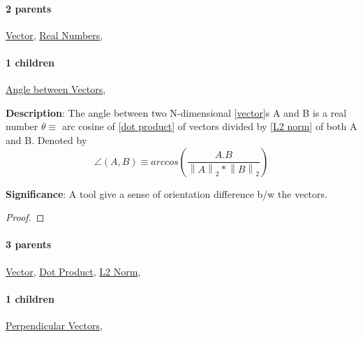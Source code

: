 \documentclass[../main.tex]{subfiles}
\newcommand{\norm}[1]{\left\lVert#1\right\rVert}
\begin{document}
\paragraph{2 parents} \hyperref[statement:Vector]{Vector}, \hyperref[statement:Real Numbers]{Real Numbers}, 
\paragraph{1 children} \hyperref[statement:Angle between Vectors]{Angle between Vectors}, 



\begin{statement}
\label{statement:Angle between Vectors}\hspace*{0pt}\par
\end{statement}
\textbf{Description}:
The angle between two N-dimensional [\hyperref[statement:Vector]{vector}]s A and B is a real number $ \theta \equiv $ arc cosine of [\hyperref[statement:Dot Product]{dot product}] of vectors divided by [\hyperref[statement:L2 Norm]{L2 norm}] of both A and B. Denoted by
\[
  \angle(A,B) \equiv arccos(\frac{A.B}{\norm{A}_2 * \norm{B}_2})
\]
\par
{\color{magenta} \textbf{Significance}:
A tool give a sense of orientation difference b/w the vectors.
\par}
\begin{proof}
\proofbydefinition
\end{proof}\par
\paragraph{3 parents} \hyperref[statement:Vector]{Vector}, \hyperref[statement:Dot Product]{Dot Product}, \hyperref[statement:L2 Norm]{L2 Norm}, 
\paragraph{1 children} \hyperref[statement:Perpendicular Vectors]{Perpendicular Vectors}, 
\end{document}
